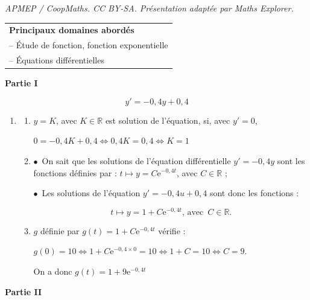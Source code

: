 \documentclass[10pt]{article}
\providecommand{\starredbullet}{\ensuremath{\bullet}}
\providecommand{\R}{\mathbb{R}}
\begin{document}
\noindent\textit{APMEP / CoopMaths. CC BY-SA. Présentation adaptée par Maths Explorer.}\par\medskip
\medskip

\begin{tabular}{|l|}\hline
\textbf{Principaux domaines abordés}\\
-- Étude de fonction, fonction exponentielle\\
-- Équations différentielles\\ \hline
\end{tabular}

\bigskip

\textbf{Partie I}

\medskip



\[y'= -0,4y + 0,4\]



\medskip

\begin{enumerate}
\item 
	\begin{enumerate}
		\item 
$y = K$, avec $K \in \R$ est solution de l'équation, si, avec $y' = 0$,
		
$0 = -0,4K + 0,4 \iff 0,4K = 0,4 \iff K = 1$
		\item 
\starredbullet~On sait que les solutions de l'équation différentielle $y' = - 0,4y$ sont les fonctions définies par : $t \longmapsto y = C\text{e}^{-0,4t}$, avec $C \in \R$ ;
		
\starredbullet~Les solutions de l'équation $y' = - 0,4u + 0,4$ sont donc les fonctions :

\[t \longmapsto y = 1 + C\text{e}^{-0,4t},\, \text{avec }\,  C \in \R.\]

\item 
$g$ définie par $g(t) = 1 + C\text{e}^{-0,4t}$ vérifie :

$g(0) = 10 \iff 1 + C\text{e}^{-0,4\times 0} = 10 \iff 1 + C = 10 \iff C = 9$.

On a donc $g(t) = 1 + 9\text{e}^{-0,4t}$
	\end{enumerate}
\end{enumerate}

\bigskip

\textbf{Partie II}

\medskip





\smallskip
\end{document}
